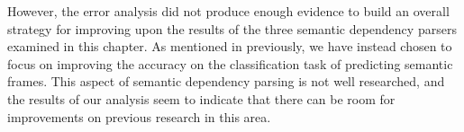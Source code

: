 However, the error analysis did not produce enough evidence to build an overall strategy for improving upon the results of the three semantic dependency parsers examined in this chapter. As mentioned in previously, we have instead chosen to focus on improving the accuracy on the classification task of predicting semantic frames. This aspect of semantic dependency parsing is not well researched, and the results of our analysis seem to indicate that there can be room for improvements on previous research in this area.


